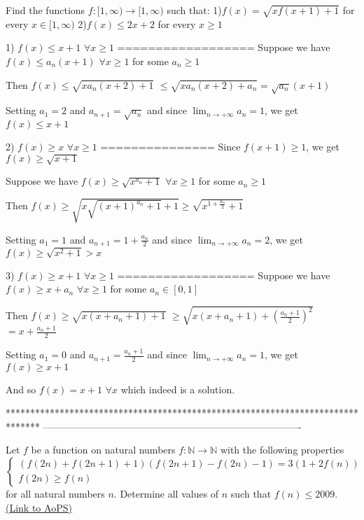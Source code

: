 \begin{solution}
	\begin{tcolorbox}Find the functions $f:[1,\infty) \rightarrow [1,\infty)$ such that:
1)$f(x)=\sqrt{xf(x+1)+1}$ for every $x \in [1, \infty)$ 
2)$f(x) \le 2x+2$ for every $x \ge 1$\end{tcolorbox}
1) $f(x)\le x+1$ $\forall x\ge 1$
==================
Suppose we have $f(x)\le a_n(x+1)$ $\forall x\ge 1$ for some $a_n\ge 1$

Then $f(x)\le\sqrt{xa_n(x+2)+1}$ $\le \sqrt{xa_n(x+2)+a_n}=\sqrt{a_n}(x+1)$

Setting $a_1=2$ and $a_{n+1}=\sqrt{a_n}$ and since $\lim_{n\to+\infty}a_n=1$, we get $f(x)\le x+1$

2) $f(x)\ge x$ $\forall x\ge 1$
===============
Since $f(x+1)\ge 1$, we get $f(x)\ge\sqrt{x+1}$

Suppose we have $f(x)\ge \sqrt{x^{a_n}+1}$ $\forall x\ge 1$ for some $a_n\ge 1$

Then $f(x)\ge\sqrt{x\sqrt{(x+1)^{a_n}+1}+1}\ge \sqrt{x^{1+\frac{a_n}2}+1}$

Setting $a_1=1$ and $a_{n+1}=1+\frac{a_n}2$ and since $\lim_{n\to+\infty}a_n=2$, we get $f(x)\ge \sqrt {x^2+1}>x$

3) $f(x)\ge x+1$ $\forall x\ge 1$
==================
Suppose we have $f(x)\ge x+a_n$ $\forall x\ge 1$ for some $a_n\in[0,1]$

Then $f(x)\ge\sqrt{x(x+a_n+1)+1}$ $\ge \sqrt{x(x+a_n+1)+\left(\frac{a_n+1}2\right)^2}$ $=x+\frac{a_n+1}2$

Setting $a_1=0$ and $a_{n+1}=\frac{a_n+1}2$ and since $\lim_{n\to+\infty}a_n=1$, we get $f(x)\ge x+1$


And so $\boxed{f(x)=x+1}$ $\forall x$ which indeed is a solution.
\end{solution}
*******************************************************************************
-------------------------------------------------------------------------------

\begin{problem}
	Let $f$ be a function on natural numbers $f:\mathbb{N}\to\mathbb{N}$ with the following properties 
\[\begin{cases}\left ( f(2n)+f(2n+1)+1 \right )\left ( f(2n+1)-f(2n)-1 \right )=3\left ( 1+2f(n) \right )\\f(2n)\geq f(n)\end{cases}\] for all natural numbers $n$. Determine all values of $n$ such that $f(n)\leq 2009$.
	\flushright \href{https://artofproblemsolving.com/community/c6h560850}{(Link to AoPS)}
\end{problem}



